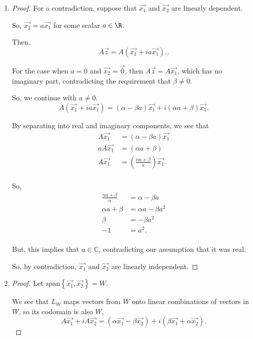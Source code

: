 \documentclass{article}
\begin{document}
\begin{enumerate}[label=(\alph*)]
  \item \begin{proof}
      For a contradiction, suppose that $\vec{x_1}$ and $\vec{x_2}$ are linearly dependent. 

      So, $\vec{x_2}=a\vec{x_1}$ for some scalar $a \in \R$. 

      Then,
      \[
      A\vec{z}=A(\vec{x_1}+i a \vec{x_1}).
      .\] 

      For the case when $a=0$ and $\vec{x_2}=\vec{0}$, then $A\vec{z}=A\vec{x_1}$, which has no imaginary part, contradicting the requirement that $\beta \neq 0$. 

      So, we continue with $a \neq 0$. 
      \[
        A(\vec{x_1}+i a \vec{x_1})= (\alpha-\beta a)\vec{x_1}+i(\alpha a + \beta)\vec{x_1}
      .\] 
     
      By separating into real and imaginary components, we see that
      \begin{align*}
        A\vec{x_1}&= (\alpha-\beta a)\vec{x_1} \\
        aA\vec{x_1}&= (\alpha a + \beta) \\
        A\vec{x_1}&= \left(\frac{\alpha a + \beta}{a}\right) \vec{x_1}.\\
      \end{align*}

      So,
      \begin{align*}
        \frac{\alpha a + \beta}{a}&= \alpha - \beta a \\
        \alpha a + \beta &= \alpha a - \beta a^2 \\
        \beta &= -\beta a^2 \\
        -1 &= a^2. \\
      \end{align*}

      But, this implies that $a \in \mathbb{C}$, contradicting our assumption that it was real. 

      So, by contradiction, $\vec{x_1}$ and $\vec{x_2}$ are linearly independent. 
    \end{proof}

  \item \begin{proof}

    Let $\text{span}\left\{ \vec{x_1},\vec{x_2} \right\} = W$.

    We see that $L_W$ maps vectors from $W$ onto linear combinations of vectors in $W$, so its codomain is also $W$,
 \[
   A\vec{x_1}+iA\vec{x_2}=(\alpha\vec{x_1}-\beta\vec{x_2})+i(\beta\vec{x_1}+\alpha\vec{x_2})
 .\]


\end{proof}
\end{enumerate}
\end{document}
